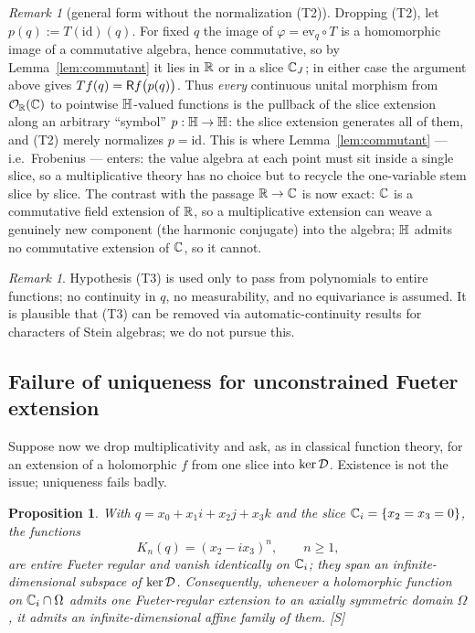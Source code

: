 \documentclass[11pt]{amsart}
\newtheorem{proposition}[theorem]{Proposition}
\theoremstyle{definition}
\theoremstyle{remark}
\newtheorem{remark}[theorem]{Remark}
\begin{document}
\begin{remark}[general form without the normalization
\textup{(T2)}]\label{rem:symbol}
Dropping (T2), let $p(q):=T(\mathrm{id})(q)$.  For fixed $q$ the image of
$\varphi=\mathrm{ev}_q\circ T$ is a homomorphic image of a commutative
algebra, hence commutative, so by Lemma~\ref{lem:commutant} it lies in
$\mathbb{R}$ or in a slice $\mathbb{C}_{J}$; in either case the argument above gives
$Tf(q)=\mathsf{R} f\bigl(p(q)\bigr)$.  Thus \emph{every} continuous unital
morphism from $\mathcal{O}_{\mathbb{R}}(\mathbb{C})$ to pointwise $\mathbb{H}$-valued functions is the pullback of
the slice extension along an arbitrary ``symbol'' $p:\mathbb{H}\to\mathbb{H}$: the slice
extension generates all of them, and (T2) merely normalizes $p=\mathrm{id}$.
This is where Lemma~\ref{lem:commutant} --- i.e.\ Frobenius --- enters: the
value algebra at each point must sit inside a single slice, so a
multiplicative theory has no choice but to recycle the one-variable stem
slice by slice.  The contrast with the passage $\mathbb{R}\to\mathbb{C}$ is now exact:
$\mathbb{C}$ is a commutative field extension of $\mathbb{R}$, so a multiplicative
extension can weave a genuinely new component (the harmonic conjugate)
into the algebra; $\mathbb{H}$ admits no commutative extension of $\mathbb{C}$, so it
cannot.
\end{remark}

\begin{remark}
Hypothesis (T3) is used only to pass from polynomials to entire functions;
no continuity in $q$, no measurability, and no equivariance is assumed.
It is plausible that (T3) can be removed via automatic-continuity results
for characters of Stein algebras; we do not pursue this.
\end{remark}

\subsection{Failure of uniqueness for unconstrained Fueter
extension}\label{app:kernel}

Suppose now we drop multiplicativity and ask, as in classical function
theory, for an extension of a holomorphic $f$ from one slice into
$\ker\mathcal{D}$.  Existence is not the issue; uniqueness fails badly.

\begin{proposition}\label{prop:kernel}
With $q=x_0+x_1i+x_2j+x_3k$ and the slice $\mathbb{C}_i=\{x_2=x_3=0\}$, the
functions
\[
K_n(q)=(x_2-ix_3)^n,\qquad n\ge1,
\]
are entire Fueter regular and vanish identically on $\mathbb{C}_i$; they span an
infinite-dimensional subspace of $\ker\mathcal{D}$.  Consequently, whenever a
holomorphic function on $\mathbb{C}_i\cap\Omega$ admits one Fueter-regular
extension to an axially symmetric domain $\Omega$, it admits an
infinite-dimensional affine family of them.  \textup{[S]}
\end{proposition}
\end{document}
